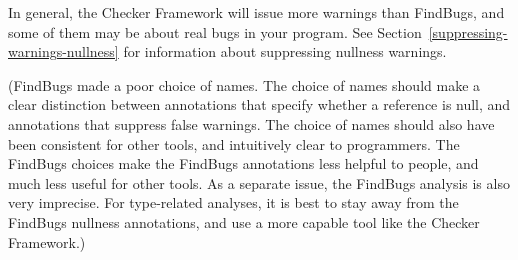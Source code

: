 In general, the Checker Framework will issue more warnings than FindBugs,
and some of them may be about real bugs in your program.
See Section~\ref{suppressing-warnings-nullness} for information about
suppressing nullness warnings.

(FindBugs made a poor choice of names.  The choice of names should make a
clear distinction between annotations that specify whether a reference is
null, and annotations that suppress false warnings.  The choice of names
should also have been consistent for other tools, and intuitively clear to
programmers.  The FindBugs choices make the FindBugs annotations less
helpful to people, and much less useful for other tools.  As a separate
issue, the FindBugs
analysis is also very imprecise.  For type-related analyses, it is best to
stay away from the FindBugs nullness annotations, and use a more capable
tool like the Checker Framework.)



%
%
%
%
%
%
%



